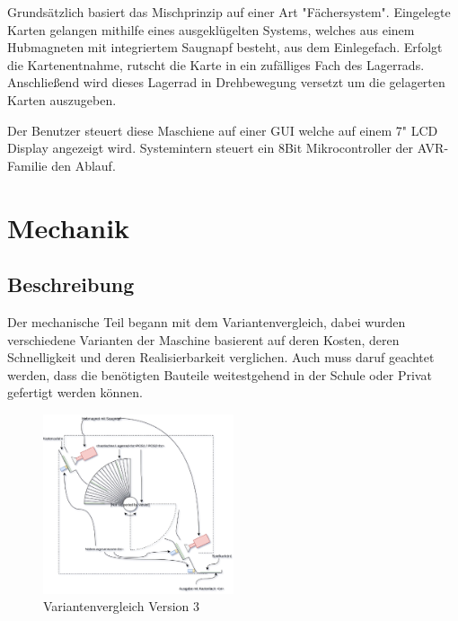 Grundsätzlich basiert das Mischprinzip auf einer Art "Fächersystem".
Eingelegte Karten gelangen mithilfe eines ausgeklügelten Systems, welches aus einem Hubmagneten mit integriertem Saugnapf besteht, aus dem Einlegefach.
Erfolgt die Kartenentnahme, rutscht die Karte in ein zufälliges Fach des Lagerrads. Anschließend wird dieses Lagerrad in Drehbewegung versetzt um die gelagerten Karten auszugeben.

Der Benutzer steuert diese Maschiene auf einer GUI welche auf einem 7" LCD Display angezeigt wird. Systemintern steuert ein 8Bit Mikrocontroller der AVR-Familie den Ablauf.

\chapter{Mechanik}
\label{sec:Mechanik}
\section{Beschreibung}

Der mechanische Teil begann mit dem Variantenvergleich, dabei wurden verschiedene Varianten der Maschine basierent auf deren Kosten, deren Schnelligkeit und deren Realisierbarkeit verglichen.
Auch muss daruf geachtet werden, dass die benötigten Bauteile weitestgehend in der Schule oder Privat gefertigt werden können.\\

\begin{figure}
    \vspace{-50pt}
    \begin{center}
        \includegraphics[width=0.5\textwidth]{fig/Reshuffled_Version_3_0_prinzip}
    \end{center}
    \caption{Variantenvergleich Version 3}
    \label{Variantenvergleich}
    \vspace{-15pt}
\end{figure}

